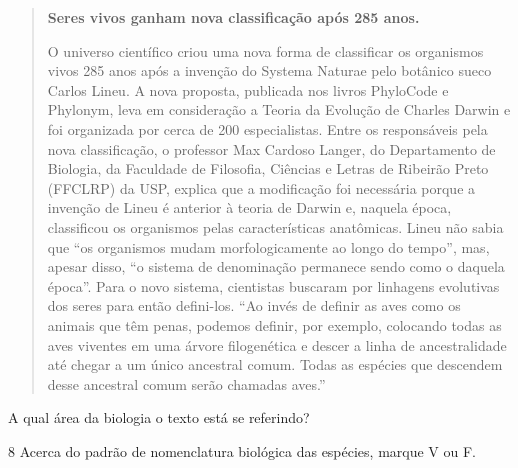 \begin{quote}
\textbf{Seres vivos ganham nova classificação após 285 anos.}

O universo científico criou uma nova forma de classificar os organismos
vivos 285 anos após a invenção do Systema Naturae pelo botânico sueco
Carlos Lineu. A nova proposta, publicada nos livros PhyloCode e
Phylonym, leva em consideração a Teoria da Evolução de Charles Darwin e
foi organizada por cerca de 200 especialistas. Entre os responsáveis
pela nova classificação, o professor Max Cardoso Langer, do Departamento
de Biologia, da Faculdade de Filosofia, Ciências e Letras de Ribeirão
Preto (FFCLRP) da USP, explica que a modificação foi necessária porque a
invenção de Lineu é anterior à teoria de Darwin e, naquela época,
classificou os organismos pelas características anatômicas. Lineu não
sabia que ``os organismos mudam morfologicamente ao longo do tempo'',
mas, apesar disso, ``o sistema de denominação permanece sendo como o
daquela época''. Para o novo sistema, cientistas buscaram por linhagens
evolutivas dos seres para então defini-los. ``Ao invés de definir as
aves como os animais que têm penas, podemos definir, por exemplo,
colocando todas as aves viventes em uma árvore filogenética e descer a
linha de ancestralidade até chegar a um único ancestral comum. Todas as
espécies que descendem desse ancestral comum serão chamadas aves.''

\end{quote}

A qual área da biologia o texto está se referindo?



\num{8}  Acerca do padrão de nomenclatura biológica das espécies, marque V ou F.

